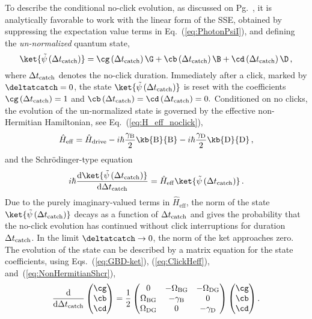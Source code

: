 To describe the conditional no-click evolution, as discussed on Pg.~\pageref{eq:SSE-click-1},
it is analytically favorable to work with the linear form of the SSE,
obtained by suppressing the expectation value terms in Eq.~(\ref{eq:PhotonPsiI}),
and defining the \emph{un-normalized} quantum state, 
\begin{equation}
\ket{\tilde{\psi}\left(\Delta t_{{\rm catch}}\right)}=\cg\left(\Delta t_{{\rm catch}}\right)\G+\cb\left(\Delta t_{{\rm catch}}\right)\B+\cd\left(\Delta t_{{\rm catch}}\right)\D\,,\label{eq:GBD-ket}
\end{equation}
where $\Delta t_{{\rm catch}}$ denotes the no-click duration. Immediately
after a click, marked by $\deltatcatch=0$, the state $\ket{\tilde{\psi}\left(\Delta t_{{\rm catch}}\right)}$
is reset with the coefficients $\cg\left(\Delta t_{{\rm catch}}\right)=1$
and $\cb\left(\Delta t_{{\rm catch}}\right)=\cd\left(\Delta t_{{\rm catch}}\right)=0.$
Conditioned on no clicks, the evolution of the un-normalized state
is governed by the effective non-Hermitian Hamiltonian, see Eq.~(\ref{eq:H_eff_noclick}),
\begin{equation}
\hat{H}_{\mathrm{eff}}=\hat{H}_{{\rm drive}}-i\hbar\frac{\gamma_{{\rm B}}}{2}\kb{\mathrm{B}}{\mathrm{B}}-i\hbar\frac{\gamma_{{\rm D}}}{2}\kb{\mathrm{D}}{\mathrm{D}}\,,\label{eq:ClickHeff}
\end{equation}
and the Schrödinger-type equation 
\begin{equation}
i\hbar\frac{\mathrm{d}\ket{\tilde{\psi}\left(\Delta t_{{\rm catch}}\right)}}{\mathrm{d}\Delta t_{{\rm catch}}}=\hat{H}_{\mathrm{eff}}\ket{\tilde{\psi}\left(\Delta t_{{\rm catch}}\right)}\,.\label{eq:NonHermitianShcr}
\end{equation}
Due to the purely imaginary-valued terms in $\hat{H}_{\mathrm{eff}}$,
the norm of the state $\ket{\tilde{\psi}\left(\Delta t_{{\rm catch}}\right)}$
decays as a function of $\Delta t_{{\rm catch}}$ and gives the probability
that the no-click evolution has continued without click interruptions
for duration $\Delta t_{{\rm catch}}$. In  the limit $\deltatcatch\rightarrow0$,
the norm of the ket approaches zero. The evolution of the state can
be described by a matrix equation for the state coefficients, using
Eqs.~(\ref{eq:GBD-ket}), (\ref{eq:ClickHeff}), and~(\ref{eq:NonHermitianShcr}),
\begin{equation}
\frac{\mathrm{d}}{\mathrm{d}\Delta t_{{\rm catch}}}\begin{pmatrix}\cg\\
\cb\\
\cd
\end{pmatrix}=\frac{1}{2}\left(\begin{matrix}0 & -\Omega_{{\rm BG}} & -\Omega_{{\rm DG}}\\
\Omega_{{\rm BG}} & -\gamma_{{\rm B}} & 0\\
\Omega_{{\rm DG}} & 0 & -\gamma_{{\rm D}}
\end{matrix}\right)\begin{pmatrix}\cg\\
\cb\\
\cd
\end{pmatrix}.\label{eqn:3x3_system}
\end{equation}

